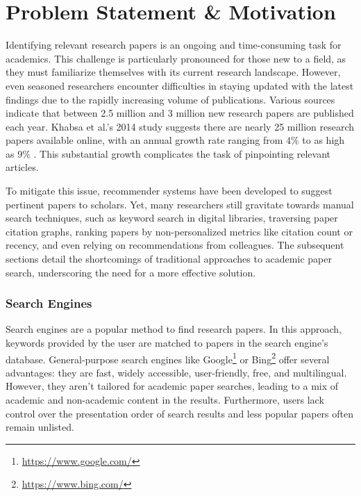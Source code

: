\section{Problem Statement \& Motivation} \label{sec:problem-statement-motivation}

Identifying relevant research papers is an ongoing and time-consuming task for academics. This challenge is particularly pronounced for those new to a field, as they must familiarize themselves with its current research landscape. However, even seasoned researchers encounter difficulties in staying updated with the latest findings due to the rapidly increasing volume of publications. Various sources indicate that between 2.5 million \cite{WareSTMReport2015} and 3 million \cite{KhadkaCapturingExploiting2020} new research papers are published each year. Khabsa et al.'s 2014 study \cite{KhabsaNumberScholarly2014} suggests there are nearly 25 million research papers available online, with an annual growth rate ranging from $4\%$ \cite{KhadkaCapturingExploiting2020} to as high as $9\%$ \cite{BornmannGrowthRates2014}. This substantial growth complicates the task of pinpointing relevant articles.

To mitigate this issue, recommender systems have been developed to suggest pertinent papers to scholars. Yet, many researchers still gravitate towards manual search techniques, such as keyword search in digital libraries, traversing paper citation graphs, ranking papers by non-personalized metrics like citation count or recency, and even relying on recommendations from colleagues.
The subsequent sections detail the shortcomings of traditional approaches to academic paper search, underscoring the need for a more effective solution.


\subsubsection*{Search Engines}

Search engines are a popular method to find research papers. In this approach, keywords provided by the user are matched to papers in the search engine's database.
General-purpose search engines like Google\footnote{\url{https://www.google.com/}} or Bing\footnote{\url{https://www.bing.com/}} offer several advantages: they are fast, widely accessible, user-friendly, free, and multilingual. However, they aren't tailored for academic paper searches, leading to a mix of academic and non-academic content in the results. Furthermore, users lack control over the presentation order of search results and less popular papers often remain unlisted.

